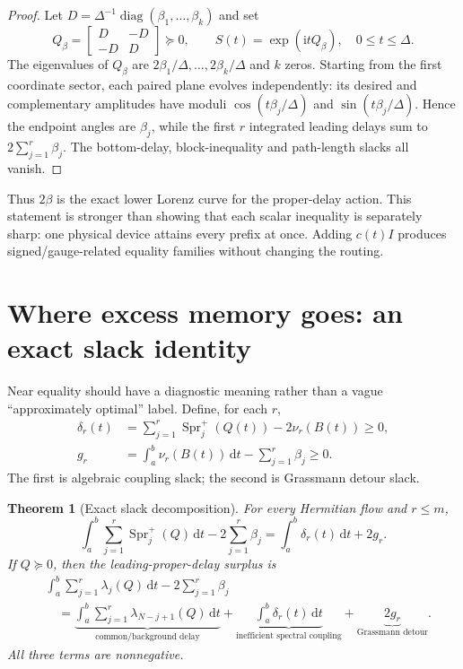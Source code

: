 \documentclass[11pt]{article}
\newtheorem{theorem}{Theorem}[section]
\theoremstyle{definition}
\theoremstyle{remark}
\newcommand{\diag}{\operatorname{diag}}
\newcommand{\dd}{\mathrm d}
\newcommand{\Spr}{\operatorname{Spr}^{+}}
\begin{document}
\begin{proof}
Let $D=\Delta^{-1}\diag(\beta_1,\ldots,\beta_k)$ and set
\begin{equation}\label{eq:saturator}
 Q_\beta=\begin{bmatrix}D&-D\\-D&D\end{bmatrix}\succeq0,
 \qquad S(t)=\exp(\mathrm itQ_\beta),\quad 0\leq t\leq\Delta.
\end{equation}
The eigenvalues of $Q_\beta$ are
$2\beta_1/\Delta,\ldots,2\beta_k/\Delta$ and $k$ zeros.  Starting from the
first coordinate sector, each paired plane evolves independently: its desired
and complementary amplitudes have moduli $\cos(t\beta_j/\Delta)$ and
$\sin(t\beta_j/\Delta)$.  Hence the endpoint angles are $\beta_j$, while
the first $r$ integrated leading delays sum to $2\sum_{j=1}^r\beta_j$.
The bottom-delay, block-inequality and path-length slacks all vanish.
\end{proof}

Thus $2\beta$ is the exact lower Lorenz curve for the proper-delay action.
This statement is stronger than showing that each scalar inequality is
separately sharp: one physical device attains every prefix at once.  Adding
$c(t)I$ produces signed/gauge-related equality families without changing the
routing.

\section{Where excess memory goes: an exact slack identity}

Near equality should have a diagnostic meaning rather than a vague
``approximately optimal'' label.  Define, for each $r$,
\begin{align}
 \delta_r(t)&=\sum_{j=1}^r\Spr_j(Q(t))-2\nu_r(B(t))\geq0,\label{eq:delta}\\
 g_r&=\int_a^b\nu_r(B(t))\,\dd t-\sum_{j=1}^r\beta_j\geq0.\label{eq:g}
\end{align}
The first is algebraic coupling slack; the second is Grassmann detour slack.

\begin{theorem}[Exact slack decomposition]\label{thm:slack}
For every Hermitian flow and $r\leq m$,
\begin{equation}\label{eq:signedslack}
 \int_a^b\sum_{j=1}^r\Spr_j(Q)\,\dd t
 -2\sum_{j=1}^r\beta_j
 =\int_a^b\delta_r(t)\,\dd t+2g_r.
\end{equation}
If $Q\succeq0$, then the leading-proper-delay surplus is
\begin{align}\label{eq:psdslack}
 &\int_a^b\sum_{j=1}^r\lambda_j(Q)\,\dd t
 -2\sum_{j=1}^r\beta_j\\
 &\quad=\underbrace{\int_a^b\sum_{j=1}^r\lambda_{N-j+1}(Q)\,\dd t}_{\text{common/background delay}}
 +\underbrace{\int_a^b\delta_r(t)\,\dd t}_{\text{inefficient spectral coupling}}
 +\underbrace{2g_r}_{\text{Grassmann detour}}.\nonumber
\end{align}
All three terms are nonnegative.
\end{theorem}
\end{document}
